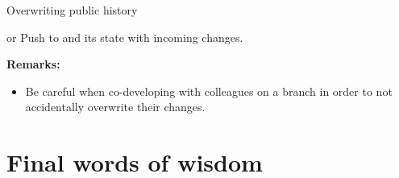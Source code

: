 \begin{frame}{Overwriting public history}
\begin{block}{ or }
Push to  and  its state with incoming changes.
\end{block}
\textbf{Remarks:}
\begin{itemize}
\item Be careful when co-developing with colleagues on a branch in order to not accidentally overwrite their changes.
\end{itemize}
\end{frame}

\section{Final words of wisdom}

